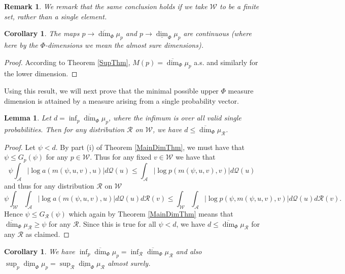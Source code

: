 \documentclass{amsart}
\newtheorem{corollary}[theorem]{Corollary}
\newtheorem{lemma}[theorem]{Lemma}
\theoremstyle{plain}
\newtheorem{remark}{Remark}
\numberwithin{equation}{section}
\newcommand{\cR}{{\mathcal R}}
\newcommand{\cQ}{{\mathcal Q}}
\newcommand{\cA}{{\mathcal A}}
\newcommand{\cW}{{\mathcal W}}
\newcommand{\odim}{\overline{\dim}}
\newcommand{\udim}{\underline{\dim}}
\begin{document}
\begin{remark}
We remark that the same conclusion holds if we take $\mathcal{W}$ to be a
finite set, rather than a single element.
\end{remark}

\begin{corollary}
The maps $p\rightarrow \odim_{\Phi }\mu _{p}$ and 
$p\rightarrow \udim_{\Phi }\mu _{p}$ are continuous 
(where here by the $\Phi $-dimensions we mean the almost sure dimensions).
\end{corollary}

\begin{proof}
According to Theorem \ref{SupThm}, $M(p)=\odim_{\Phi }\mu _{p}$
a.s. and similarly for the lower dimension.
\end{proof}

Using this result, we will next prove that the minimal possible upper $\Phi $
measure dimension is attained by a measure arising from a single probability
vector.


\begin{lemma}
Let $d = \inf_{p } \odim_\Phi \mu_p$, where the infimum is over all valid single probabilities.  
Then for any distribution $\cR$ on $\cW$, we have $d \le \odim_\Phi \mu_\cR$.
\end{lemma}


\begin{proof}
Let $\psi < d$.   By part (i) of Theorem \ref{MainDimThm}, we must have that $\psi \le G_p(\psi)$ for any $p \in \cW$.
Thus for any fixed $v \in \cW$ we have that
\begin{equation*}
   \psi \int_\cA \left| \log a(m(\psi,u,v),u)\right| d\cQ(u) \leq
            \int_\cA \left| \log p(m(\psi,u,v),v)\right| d\cQ(u) 
\end{equation*}
and thus for any distribution $\cR$ on $\cW$ 
\begin{equation*}
    \psi \int_\cW \int_\cA | \log a(m(\psi,u,v),u) | d\cQ(u) d\cR(v) \le \int_\cW \int_\cA \left| \log p(\psi,m(\psi,u,v),v)\right| d\cQ(u) d\cR(v).
\end{equation*}
Hence $\psi \le G_\cR(\psi)$ which again by Theorem \ref{MainDimThm} means that $\odim_\Phi \mu_\cR \ge \psi$ for any $\cR$.
Since this is true for all $\psi < d$, we have $d \le \odim_\Phi \mu_\cR$ for any $\cR$ as claimed.
\end{proof}

\begin{corollary}
We have $\inf_p \odim_\Phi \mu_p = \inf_{\cR} \odim_\Phi \mu_\cR$  and also $\sup_p \udim_\Phi \mu_p = \sup_{\cR} \udim_\Phi \mu_\cR$ almost surely.
\end{corollary}
\end{document}
